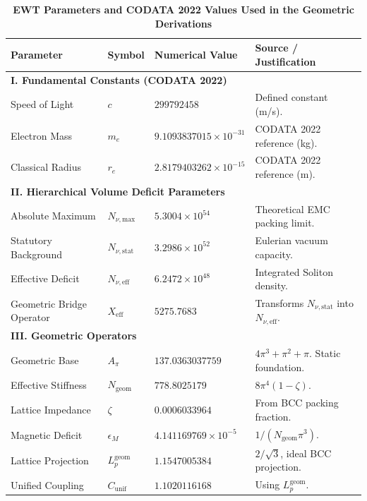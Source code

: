 \documentclass[10pt,a4paper]{article}
\begin{document}
\small
\begin{table}[h!]
	\centering
	\caption{\textbf{EWT Parameters and CODATA 2022 Values Used in the Geometric Derivations}}
	\label{tab:final_parameters}
	\begin{tabularx}{\textwidth}{l l l X}
		\toprule
		\textbf{Parameter} & \textbf{Symbol} & \textbf{Numerical Value} & \textbf{Source / Justification} \\
		\midrule
		\multicolumn{4}{l}{\textbf{I. Fundamental Constants (CODATA 2022)}} \\
		\midrule
		Speed of Light & \(c\) & \(299792458\) & Defined constant (m/s). \\
		Electron Mass & \(m_e\) & \(9.1093837015 \times 10^{-31}\) & CODATA 2022 reference (kg). \\
		Classical Radius & \(r_e\) & \(2.8179403262 \times 10^{-15}\) & CODATA 2022 reference (m). \\
		\midrule
		\multicolumn{4}{l}{\textbf{II. Hierarchical Volume Deficit Parameters}} \\
		\midrule
		Absolute Maximum & \(N_{\nu,\text{max}}\) & \(5.3004 \times 10^{54}\) & Theoretical EMC packing limit. \\
		Statutory Background & \(N_{\nu,\text{stat}}\) & \(3.2986 \times 10^{52}\) & Eulerian vacuum capacity. \\
		Effective Deficit & \(N_{\nu,\text{eff}}\) & \(6.2472 \times 10^{48}\) & Integrated Soliton density. \\
		Geometric Bridge Operator & \(X_{\text{eff}}\) & \(5275.7683\) & Transforms \(N_{\nu,\text{stat}}\) into \(N_{\nu,\text{eff}}\). \\
		\midrule
		\multicolumn{4}{l}{\textbf{III. Geometric Operators}} \\
		\midrule
		Geometric Base & \(A_\pi\) & \(137.0363037759\) & \(4\pi^3 + \pi^2 + \pi\). Static foundation. \\
		Effective Stiffness & \(N_{\text{geom}}\) & \(778.8025179\) & \(8\pi^4(1-\zeta)\). \\
		Lattice Impedance & \(\zeta\) & \(0.0006033964\) & From BCC packing fraction. \\
		Magnetic Deficit & \(\epsilon_M\) & \(4.141169769 \times 10^{-5}\) & \(1/(N_{\text{geom}}\pi^3)\). \\
		Lattice Projection & \(L_p^{\text{geom}}\) & \(1.1547005384\) & \(2/\sqrt{3}\), ideal BCC projection. \\
		Unified Coupling & \(C_{\text{unif}}\) & \(1.1020116168\) & Using \(L_p^{\text{geom}}\). \\
		\bottomrule
	\end{tabularx}
\end{table}
\normalsize
\clearpage
\end{document}
